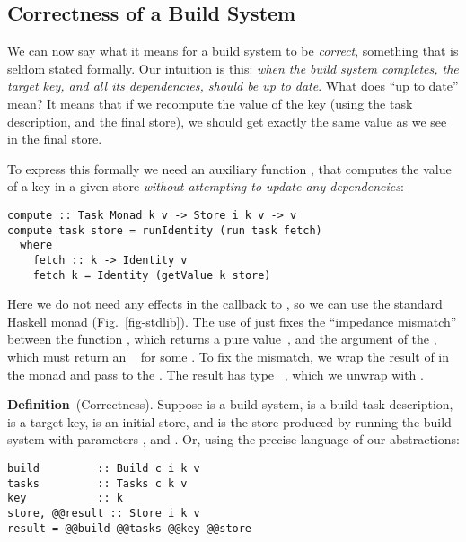 \subsection{Correctness of a Build System}\label{sec-build-correctness}

We can now say what it means for a build system to be \emph{correct}, something
that is seldom stated formally. Our intuition is this: \emph{when the build
system completes, the target key, and all its dependencies, should be up to
date}. What does ``up to date'' mean? It means that if we recompute the value of
the key (using the task description, and the final store), we should get exactly
the same value as we see in the final store.

To express this formally we need an auxiliary function , that
computes the value of a key in a given store \emph{without attempting to update
any dependencies}:

\begin{verbatim}
compute :: Task Monad k v -> Store i k v -> v
compute task store = runIdentity (run task fetch)
  where
    fetch :: k -> Identity v
    fetch k = Identity (getValue k store)
\end{verbatim}

\noindent
Here we do not need any effects in the  callback to , so
we can use the standard Haskell  monad (Fig.~\ref{fig-stdlib}).
The use of  just fixes the ``impedance mismatch'' between the
function , which returns a pure value~, and the 
argument of the , which must return an ~ for some .
To fix the mismatch, we wrap the result of  in the 
monad and pass to the . The result has type ~, which
we unwrap with .

\vspace{2mm}
\textbf{Definition}~(Correctness). Suppose  is a build system,
 is a build task description,  is a target key,  is
an initial store, and  is the store produced by running the build
system with parameters ,  and . Or, using the
precise language of our abstractions:

\begin{verbatim}
build         :: Build c i k v
tasks         :: Tasks c k v
key           :: k
store, @@result :: Store i k v
result = @@build @@tasks @@key @@store
\end{verbatim}

